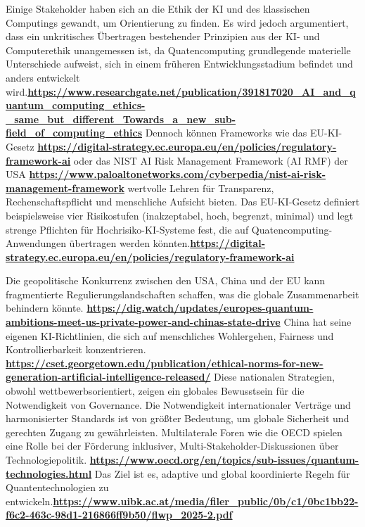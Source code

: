 {Einige Stakeholder haben sich an die Ethik der KI und des klassischen Computings gewandt, um Orientierung zu finden. Es wird jedoch argumentiert, dass ein unkritisches Übertragen bestehender Prinzipien aus der KI- und Computerethik unangemessen ist, da Quatencomputing grundlegende materielle Unterschiede aufweist, sich in einem früheren Entwicklungsstadium befindet und anders entwickelt wird.\textbf{\href{https://www.researchgate.net/publication/391817020_AI_and_quantum_computing_ethics-_same_but_different_Towards_a_new_sub-field_of_computing_ethics}{https://www.researchgate.net/publication/391817020\_AI\_and\_quantum\_computing\_ethics-\_same\_but\_different\_Towards\_a\_new\_sub-field\_of\_computing\_ethics}} Dennoch können Frameworks wie das EU-KI-Gesetz \textbf{\href{https://digital-strategy.ec.europa.eu/en/policies/regulatory-framework-ai}{https://digital-strategy.ec.europa.eu/en/policies/regulatory-framework-ai}} oder das NIST AI Risk Management Framework (AI RMF) der USA \textbf{
\href{https://www.paloaltonetworks.com/cyberpedia/nist-ai-risk-management-framework}{https://www.paloaltonetworks.com/cyberpedia/nist-ai-risk-management-framework}
} wertvolle Lehren für Transparenz, Rechenschaftspflicht und menschliche Aufsicht bieten. Das EU-KI-Gesetz definiert beispielsweise vier Risikostufen (inakzeptabel, hoch, begrenzt, minimal) und legt strenge Pflichten für Hochrisiko-KI-Systeme fest, die auf Quatencomputing-Anwendungen übertragen werden könnten.\textbf{\href{https://digital-strategy.ec.europa.eu/en/policies/regulatory-framework-ai}{https://digital-strategy.ec.europa.eu/en/policies/regulatory-framework-ai}}

Die geopolitische Konkurrenz zwischen den USA, China und der EU kann fragmentierte Regulierungslandschaften schaffen, was die globale Zusammenarbeit behindern könnte. \textbf{\href{https://dig.watch/updates/europes-quantum-ambitions-meet-us-private-power-and-chinas-state-drive}{https://dig.watch/updates/europes-quantum-ambitions-meet-us-private-power-and-chinas-state-drive}} China hat seine eigenen KI-Richtlinien, die sich auf menschliches Wohlergehen, Fairness und Kontrollierbarkeit konzentrieren. \textbf{\href{https://cset.georgetown.edu/publication/ethical-norms-for-new-generation-artificial-intelligence-released/}{https://cset.georgetown.edu/publication/ethical-norms-for-new-generation-artificial-intelligence-released/}} Diese nationalen Strategien, obwohl wettbewerbsorientiert, zeigen ein globales Bewusstsein für die Notwendigkeit von Governance. Die Notwendigkeit internationaler Verträge und harmonisierter Standards ist von größter Bedeutung, um globale Sicherheit und gerechten Zugang zu gewährleisten. Multilaterale Foren wie die OECD spielen eine Rolle bei der Förderung inklusiver, Multi-Stakeholder-Diskussionen über Technologiepolitik. 
\textbf{\href{https://www.oecd.org/en/topics/sub-issues/quantum-technologies.html}{https://www.oecd.org/en/topics/sub-issues/quantum-technologies.html}} Das Ziel ist es, adaptive und global koordinierte Regeln für Quantentechnologien zu entwickeln.\textbf{\href{https://www.uibk.ac.at/media/filer_public/0b/c1/0bc1bb22-f6c2-463c-98d1-216866ff9b50/flwp_2025-2.pdf}{https://www.uibk.ac.at/media/filer\_public/0b/c1/0bc1bb22-f6c2-463c-98d1-216866ff9b50/flwp\_2025-2.pdf}}

}
